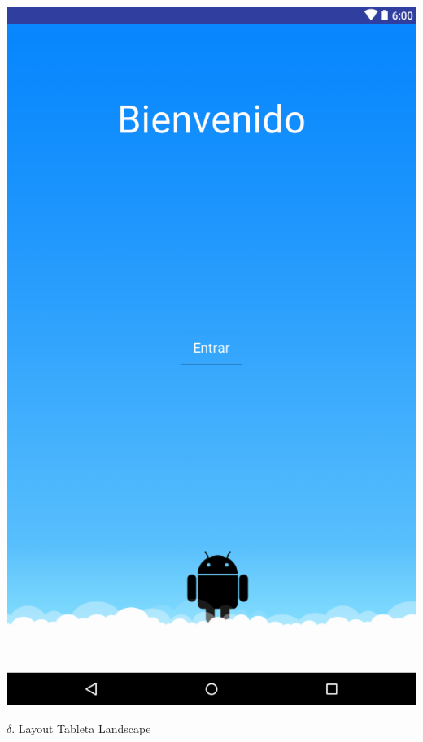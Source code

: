 \documentclass{article}
\begin{document}
\begin{center}

\includegraphics[scale=.2]{layout-2016-04-17-esp_tab_lay.png} 

\end{center}

$\delta$. Layout Tableta Landscape\\\\
\end{document}

